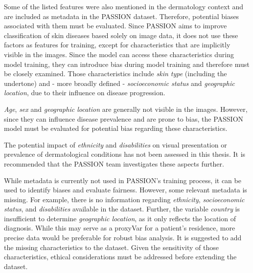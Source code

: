 \documentclass[12pt, a4paper, oneside]{book}   	%
\begin{document}
			
			Some of the listed features were also mentioned in the dermatology context and are included as metadata in the PASSION dataset. Therefore, potential biases associated with them must be evaluated.
			Since PASSION aims to improve classification of skin diseases based solely on image data, it does not use these factors as features for training, except for characteristics that are implicitly visible in the images. Since the model can access these characteristics during model training, they can introduce bias during model training and therefore must be closely examined. Those characteristics include \textit{skin type} (including the undertone) and - more broadly defined - \textit{socioeconomic status} and \textit{geographic location}, due to their influence on disease progression.
			
			\textit{Age}, \textit{sex} and \textit{geographic location} are generally not visible in the images. However, since they can influence disease prevalence and are prone to bias, the PASSION model must be evaluated for potential bias regarding these characteristics.
			
			The potential impact of \textit{ethnicity} and \textit{disabilities} on visual presentation or prevalence of dermatological conditions has not been assessed in this thesis. It is recommended that the PASSION team investigates these aspects further.
			
			While metadata is currently not used in PASSION's training process, it can be used to identify biases and evaluate fairness. However, some relevant metadata is missing. For example, there is no information regarding \textit{ethnicity}, \textit{socioeconomic status}, and \textit{disabilities} available in the dataset. Further, the variable \textit{country} is insufficient to determine \textit{geographic location}, as it only reflects the location of diagnosis. While this may serve as a \gls{proxyVar} for a patient's residence, more precise data would be preferable for robust bias analysis.
			It is suggested to add the missing characteristics to the dataset. Given the sensitivity of those characteristics, ethical considerations must be addressed before extending the dataset.
			
			
			
\end{document}
